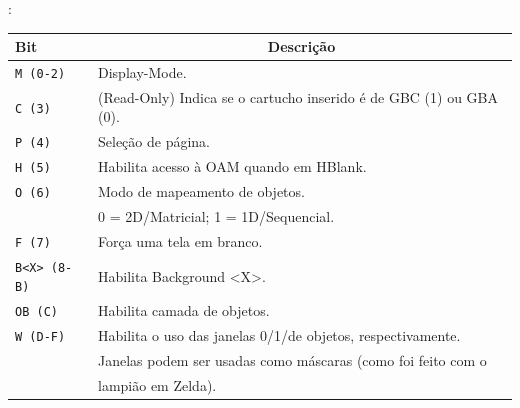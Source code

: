 \documentclass{beamer}
\begin{document}
\begin{darkframes}
\begin{frame}{\secname: \subsecname}
    \scriptsize{\begin{center}
        \begin{tabular}{|l|l|}
            \hline
            Bit & \multicolumn{1}{|c|}{Descrição} \\\hline
            \texttt{M (0-2)} & Display-Mode. \\\hline
            \texttt{C (3)} & (Read-Only) Indica se o cartucho inserido é de GBC (1) ou GBA (0). \\\hline
            \texttt{P (4)} & Seleção de página. \\\hline
            \texttt{H (5)} & Habilita acesso à OAM quando em HBlank. \\\hline
            \texttt{O (6)} & Modo de mapeamento de objetos.\\
                           & 0 = 2D/Matricial; 1 = 1D/Sequencial. \\\hline
            \texttt{F (7)} & Força uma tela em branco. \\\hline
            \texttt{B<X> (8-B)} & Habilita Background <X>. \\\hline
            \texttt{OB (C)} & Habilita camada de objetos. \\\hline
            \texttt{W (D-F)} & Habilita o uso das janelas 0/1/de objetos, respectivamente. \\
                             & Janelas podem ser usadas como máscaras (como foi feito com o \\
                             & lampião em Zelda). \\\hline
        \end{tabular}
    \end{center}}
\end{frame}

\end{darkframes}
\end{document}
